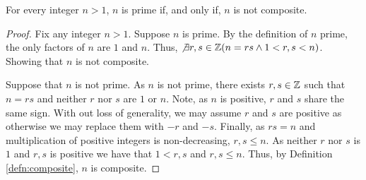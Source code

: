 \guard




\begin{lem}
\label{lem:notPrimeIsComposite}
  For every integer $n>1$, $n$ is prime if, and only if, $n$ is not composite.
\end{lem}
\begin{proof}
  Fix any integer $n>1$.
  Suppose $n$ is prime.
  By the definition of $n$ prime, the only factors of $n$ are $1$ and $n$.
  Thus, $\not\exists r,s\in\mathbb{Z}(n=rs\wedge 1<r,s<n)$.
  Showing that $n$ is not composite.

  Suppose that $n$ is not prime.
  As $n$ is not prime, there exists $r,s\in\mathbb{Z}$ such that $n=rs$ and neither $r$ nor $s$ are $1$ or $n$.
  Note, as $n$ is positive, $r$ and $s$ share the same sign.
  With out loss of generality, we may assume $r$ and $s$ are positive as otherwise we may replace them with $-r$ and $-s$.
  Finally, as $rs=n$ and multiplication of positive integers is non-decreasing, $r,s\leq n$.
  As neither $r$ nor $s$ is $1$ and $r,s$ is positive we have that $1<r,s$ and $r,s\leq n$.
  Thus, by Definition \ref{defn:composite}, $n$ is composite.
\end{proof}
